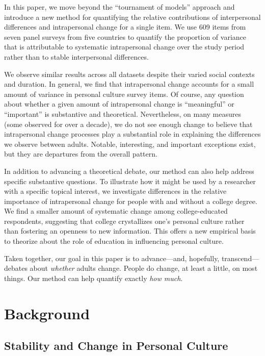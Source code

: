 \documentclass[
  12pt,
]{article}
\begin{document}
In this paper, we move beyond the ``tournament of models'' approach and
introduce a new method for quantifying the relative contributions of
interpersonal differences and intrapersonal change for a single item. We
use 609 items from seven panel surveys from five countries to quantify
the proportion of variance that is attributable to systematic
intrapersonal change over the study period rather than to stable
interpersonal differences.

We observe similar results across all datasets despite their varied
social contexts and duration. In general, we find that intrapersonal
change accounts for a small amount of variance in personal culture
survey items. Of course, any question about whether a given amount of
intrapersonal change is ``meaningful'' or ``important'' is substantive
and theoretical. Nevertheless, on many measures (some observed for over
a decade), we do not see enough change to believe that intrapersonal
change processes play a substantial role in explaining the differences
we observe between adults. Notable, interesting, and important
exceptions exist, but they are departures from the overall pattern.

In addition to advancing a theoretical debate, our method can also help
address specific substantive questions. To illustrate how it might be
used by a researcher with a specific topical interest, we investigate
differences in the relative importance of intrapersonal change for
people with and without a college degree. We find a smaller amount of
systematic change among college-educated respondents, suggesting that
college crystallizes one's personal culture rather than fostering an
openness to new information. This offers a new empirical basis to
theorize about the role of education in influencing personal culture.

Taken together, our goal in this paper is to advance---and, hopefully,
transcend---debates about \emph{whether} adults change. People do
change, at least a little, on most things. Our method can help quantify
exactly \emph{how much}.

\hypertarget{background}{%
\section{Background}\label{background}}

\hypertarget{stability-and-change-in-personal-culture}{%
\subsection{Stability and Change in Personal
Culture}\label{stability-and-change-in-personal-culture}}
\end{document}
